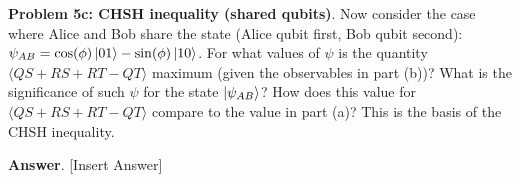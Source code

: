 \textbf{Problem 5c: CHSH inequality (shared qubits)}. Now consider the case where Alice and Bob share the state (Alice qubit first, Bob qubit second): $\psi_{AB} = \cos(\phi)\ket{01} - \sin(\phi)\ket{10}$. 
For what values of $\psi$ is the quantity $\langle QS + RS + RT - QT\rangle$ maximum (given the observables in part (b))? 
What is the significance of such $\psi$ for the state $\ket{\psi_{AB}}$? 
How does this value for $\langle QS + RS + RT - QT\rangle$ compare to the value in part (a)? 
This is the basis of the CHSH inequality.


\textbf{Answer}. [Insert Answer]



